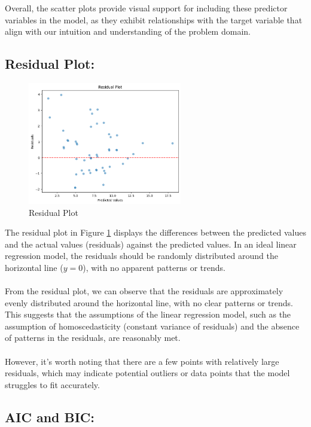 \documentclass{article}
\begin{document}
\noindent Overall, the scatter plots provide visual support for including these predictor variables in the model, as they exhibit relationships with the target variable that align with our intuition and understanding of the problem domain.

\subsection*{Residual Plot:}

\begin{figure}[H]
    \centering
    \includegraphics[width=0.6\textwidth]{ResidualPlot.png}
    \caption{Residual Plot}
    \label{ResidualPlot}
\end{figure}

The residual plot in Figure \ref*{ResidualPlot} displays the differences between the predicted values and the actual values (residuals) against the predicted values. In an ideal linear regression model, the residuals should be randomly distributed around the horizontal line ($y=0$), with no apparent patterns or trends.
\\\\
From the residual plot, we can observe that the residuals are approximately evenly distributed around the horizontal line, with no clear patterns or trends. This suggests that the assumptions of the linear regression model, such as the assumption of homoscedasticity (constant variance of residuals) and the absence of patterns in the residuals, are reasonably met.
\\\\
However, it's worth noting that there are a few points with relatively large residuals, which may indicate potential outliers or data points that the model struggles to fit accurately.

\subsection*{AIC and BIC:}
\end{document}
